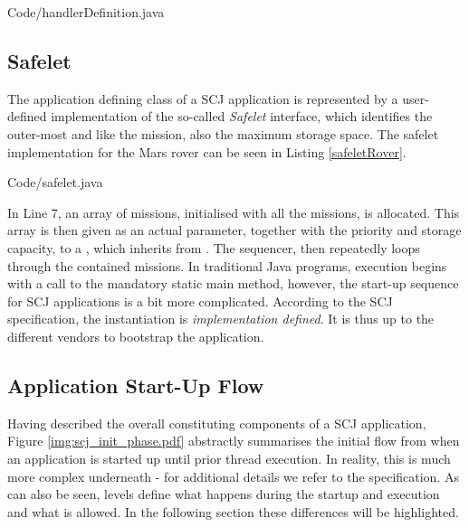 
{Code/handlerDefinition.java}

\subsection{Safelet}
\label{subsection:safelet}
The application defining class of a SCJ application is represented by a user-defined implementation of the so-called \textit{Safelet} interface, which identifies the outer-most  and like the mission, also the maximum storage space. The safelet implementation for the Mars rover can be seen in Listing \ref{safeletRover}.


{Code/safelet.java}

In Line 7, an array of missions, initialised with all the missions, is allocated. This array is then given as an actual parameter, together with the priority and storage capacity, to a , which inherits from . The sequencer, then repeatedly loops through the contained missions. In traditional Java programs, execution begins with a call to the mandatory static main method, however, the start-up sequence for SCJ applications is a bit more complicated. According to the SCJ specification, the  instantiation is \textit{implementation defined}. It is thus up to the different vendors to bootstrap the application.

\subsection{Application Start-Up Flow}
Having described the overall constituting components of a SCJ application, Figure \ref{img:scj_init_phase.pdf} abstractly summarises the initial flow from when an application is started up until prior thread execution. In reality, this is much more complex underneath - for additional details we refer to the specification. As can also be seen, levels define what happens during the startup and execution and what is allowed. In the following section these differences will be highlighted.

